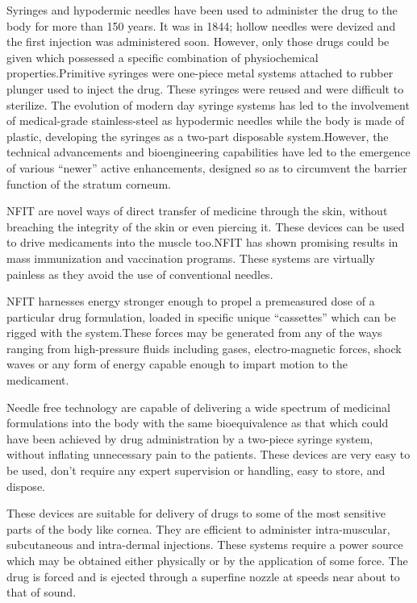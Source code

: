 \documentclass[12pt]{article}
\begin{document}
\indent

Syringes and hypodermic needles have been used to administer the drug to the body for more than 150 years. It was in 1844; hollow needles were devized and the first injection was administered soon. However, only those drugs could be given which possessed a specific combination of physiochemical properties.Primitive syringes were one-piece metal systems attached to rubber plunger used to inject the drug. These syringes were reused and were difficult to sterilize. The evolution of modern day syringe systems has led to the involvement of medical-grade stainless-steel as hypodermic needles while the body is made of plastic, developing the syringes as a two-part disposable system.However, the technical advancements and bioengineering capabilities have led to the emergence of various “newer” active enhancements, designed so as to circumvent the barrier function of the stratum corneum.

\indent

NFIT are novel ways of direct transfer of medicine through the skin, without breaching the integrity of the skin or even piercing it. These devices can be used to drive medicaments into the muscle too.NFIT has shown promising results in mass immunization and vaccination programs. These systems are virtually painless as they avoid the use of conventional needles.

\indent

NFIT harnesses energy stronger enough to propel a premeasured dose of a particular drug formulation, loaded in specific unique “cassettes” which can be rigged with the system.These forces may be generated from any of the ways ranging from high-pressure fluids including gases, electro-magnetic forces, shock waves or any form of energy capable enough to impart motion to the medicament.

\indent

Needle free technology are capable of delivering a wide spectrum of medicinal formulations into the body with the same bioequivalence as that which could have been achieved by drug administration by a two-piece syringe system, without inflating unnecessary pain to the patients. These devices are very easy to be used, don't require any expert supervision or handling, easy to store, and dispose.

\indent

These devices are suitable for delivery of drugs to some of the most sensitive parts of the body like cornea. They are efficient to administer intra-muscular, subcutaneous and intra-dermal injections. These systems require a power source which may be obtained either physically or by the application of some force. The drug is forced and is ejected through a superfine nozzle at speeds near about to that of sound.
\end{document}
